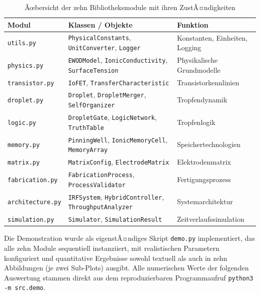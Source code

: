 ﻿\documentclass[a4paper,12pt]{scrreprt}
\theoremstyle{definition}
\begin{document}
\begin{table}
	\centering
	\caption{Ãœbersicht der zehn Bibliotheksmodule mit ihren ZustÃ¤ndigkeiten}
	\label{tab:module_overview}
	\begin{tabular}{lll}
		\toprule
		\textbf{Modul} & \textbf{Klassen / Objekte} & \textbf{Funktion} \\
		\midrule
		\texttt{utils.py}        & \texttt{PhysicalConstants}, \texttt{UnitConverter}, \texttt{Logger} & Konstanten, Einheiten, Logging \\
		\texttt{physics.py}      & \texttt{EWODModel}, \texttt{IonicConductivity}, \texttt{SurfaceTension} & Physikalische Grundmodelle \\
		\texttt{transistor.py}   & \texttt{IoFET}, \texttt{TransferCharacteristic} & Transistorkennlinien \\
		\texttt{droplet.py}      & \texttt{Droplet}, \texttt{DropletMerger}, \texttt{SelfOrganizer} & Tropfendynamik \\
		\texttt{logic.py}        & \texttt{DropletGate}, \texttt{LogicNetwork}, \texttt{TruthTable} & Tropfenlogik \\
		\texttt{memory.py}       & \texttt{PinningWell}, \texttt{IonicMemoryCell}, \texttt{MemoryArray} & Speichertechnologien \\
		\texttt{matrix.py}       & \texttt{MatrixConfig}, \texttt{ElectrodeMatrix} & Elektrodenmatrix \\
		\texttt{fabrication.py}  & \texttt{FabricationProcess}, \texttt{ProcessValidator} & Fertigungsprozess \\
		\texttt{architecture.py} & \texttt{IRFSystem}, \texttt{HybridController}, \texttt{ThroughputAnalyzer} & Systemarchitektur \\
		\texttt{simulation.py}   & \texttt{Simulator}, \texttt{SimulationResult} & Zeitverlaufssimulation \\
		\bottomrule
	\end{tabular}
\end{table}

Die Demonstration wurde als eigenstÃ¤ndiges Skript \texttt{demo.py} implementiert,
das alle zehn Module sequentiell instanziiert, mit realistischen Parametern
konfiguriert und quantitative Ergebnisse sowohl textuell als auch in zehn
Abbildungen (je zwei Sub-Plots) ausgibt. Alle numerischen Werte der folgenden
Auswertung stammen direkt aus dem reproduzierbaren Programmaufruf
\texttt{python3 -m src.demo}.

\end{document}
